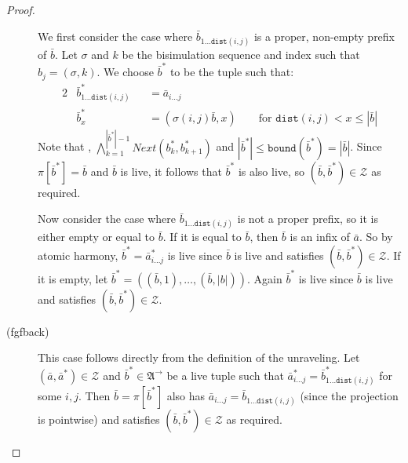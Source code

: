 \documentclass[draft]{scrartcl}
\theoremstyle{definition}
\newcommand{\dist}[2]{\mathtt{dist}({#1},{#2})}
\newcommand{\nextrel}[2]{\mathit{Next}({#1},{#2})}
\newcommand{\lift}[1]{\mathtt{lift}({#1})}
\newcommand{\sij}{_{i\ldots{}j}}
\begin{document}
\begin{proof}
\begin{description}
          We first consider the case where $\bar{b}_{1\ldots{}\dist{i}{j}}$ is a proper, non-empty prefix of $\bar{b}$.
          Let $\sigma$ and $k$ be the bisimulation sequence and index such that $b_{j} = (\sigma, k)$.
          We choose $\bar{b}^{*}$ to be the tuple such that:
          \begin{alignat*}{2}
            &\bar{b}^{*}_{1\ldots{}\dist{i}{j}} &&= \bar{a}\sij \\
            &\bar{b}^{*}_{x} &&= (\sigma (i,j) \bar{b}, x) \qquad \text{for\ }\dist{i}{j} < x \le |\bar{b}|
          \end{alignat*}
          Note that , $\bigwedge_{k=1}^{|\bar{b}^{*}|-1}{\nextrel{b^{*}_{k}}{b^{*}_{k+1}}}$ and $|\bar{b}^{*}| \le \mathtt{bound}(\bar{b}^{*}) = |\bar{b}|$.
          Since $\pi[\bar{b}^{*}] = \bar{b}$ and $\bar{b}$ is live, it follows that $\bar{b}^{*}$ is also live, so $(\bar{b}, \bar{b}^{*}) \in \mathcal{Z}$ as required.

          Now consider the case where $\bar{b}_{1\ldots{}\dist{i}{j}}$ is not a proper prefix, so it is either empty or equal to $\bar{b}$.
          If it is equal to $\bar{b}$, then $\bar{b}$ is an infix of $\bar{a}$.
          So by atomic harmony, $\bar{b}^{*} = \bar{a}^{*}\sij$ is live since $\bar{b}$ is live and satisfies $(\bar{b}, \bar{b}^{*}) \in \mathcal{Z}$.
          If it is empty, let $\bar{b}^{*} = ((\bar{b}, 1), \ldots{}, (\bar{b}, |b|))$.
          Again $\bar{b}^{*}$ is live since $\bar{b}$ is live and satisfies $(\bar{b}, \bar{b}^{*}) \in \mathcal{Z}$.

    \item[(fgfback)]
          This case follows directly from the definition of the unraveling.
          Let $(\bar{a}, \bar{a}^{*}) \in \mathcal{Z}$ and $\bar{b}^{*} \in \mathfrak{A}^{\rightarrow}$ be a live tuple such that $\bar{a}^{*}\sij = \bar{b}^{*}_{1\ldots{}\dist{i}{j}}$ for some $i,j$.
          Then $\bar{b} = \pi[\bar{b}^{*}]$ also has $\bar{a}_{i\ldots{}j} = \bar{b}_{1\ldots{}\dist{i}{j}}$ (since the projection is pointwise) and satisfies $(\bar{b}, \bar{b}^{*}) \in \mathcal{Z}$ as required.
  \end{description}
\end{proof}
\end{document}
